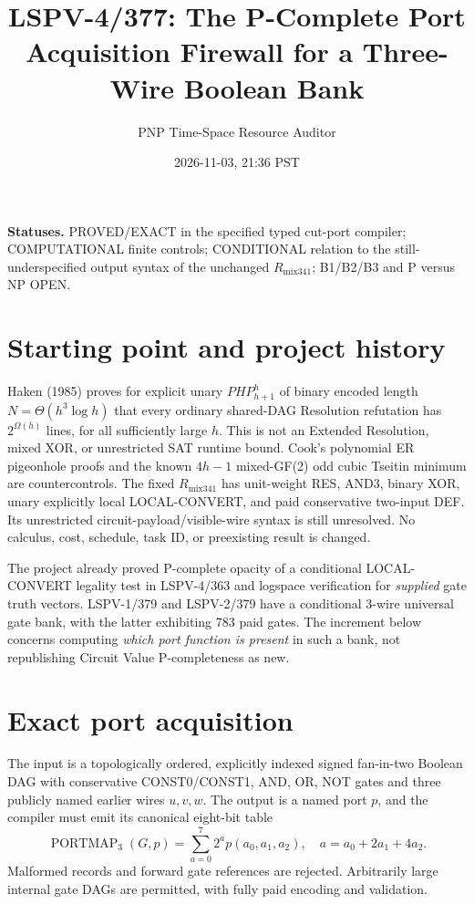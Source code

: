 \documentclass[11pt]{article}
\title{LSPV-4/377: The P-Complete Port Acquisition Firewall for a Three-Wire Boolean Bank}
\author{PNP Time-Space Resource Auditor}
\date{2026-11-03, 21:36 PST}
\begin{document}
\maketitle
\noindent\textbf{Statuses.} PROVED/EXACT in the specified typed cut-port compiler; COMPUTATIONAL finite controls; CONDITIONAL relation to the still-underspecified output syntax of the unchanged $R_{\mathrm{mix341}}$; B1/B2/B3 and P versus NP OPEN.

\section*{Starting point and project history}
Haken (1985) proves for explicit unary $PHP_{h+1}^h$ of binary encoded length $N=\Theta(h^3\log h)$ that every ordinary shared-DAG Resolution refutation has $2^{\Omega(h)}$ lines, for all sufficiently large $h$. This is not an Extended Resolution, mixed XOR, or unrestricted SAT runtime bound. Cook's polynomial ER pigeonhole proofs and the known $4h-1$ mixed-GF(2) odd cubic Tseitin minimum are countercontrols. The fixed $R_{\mathrm{mix341}}$ has unit-weight RES, AND3, binary XOR, unary explicitly local LOCAL-CONVERT, and paid conservative two-input DEF. Its unrestricted circuit-payload/visible-wire syntax is still unresolved. No calculus, cost, schedule, task ID, or preexisting result is changed.

The project already proved P-complete opacity of a conditional LOCAL-CONVERT legality test in LSPV-4/363 and logspace verification for \emph{supplied} gate truth vectors. LSPV-1/379 and LSPV-2/379 have a conditional 3-wire universal gate bank, with the latter exhibiting 783 paid gates. The increment below concerns computing \emph{which port function is present} in such a bank, not republishing Circuit Value P-completeness as new.

\section*{Exact port acquisition}
The input is a topologically ordered, explicitly indexed signed fan-in-two Boolean DAG with conservative CONST0/CONST1, AND, OR, NOT gates and three publicly named earlier wires $u,v,w$. The output is a named port $p$, and the compiler must emit its canonical eight-bit table
\[
\operatorname{PORTMAP}_3(G,p)=\sum_{a=0}^7 2^a p(a_0,a_1,a_2),\quad a=a_0+2a_1+4a_2.
\]
Malformed records and forward gate references are rejected. Arbitrarily large internal gate DAGs are permitted, with fully paid encoding and validation.
\end{document}
